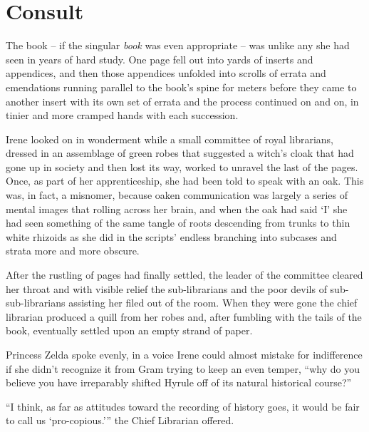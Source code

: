 \documentclass[../FGP.tex]{subfiles}
\begin{document}
\section{Consult}
\begin{fragment}The book -- if the singular \emph{book} was even appropriate -- was unlike any she had seen in years of hard study. One page fell out into yards of inserts and appendices, and then those appendices unfolded into scrolls of errata and emendations running parallel to the book's spine for meters before they came to another insert with its own set of errata and the process continued on and on, in tinier and more cramped hands with each succession. 

Irene looked on in wonderment while a small committee of royal librarians, dressed in an assemblage of green robes that suggested a witch's cloak that had gone up in society and then lost its way, worked to unravel the last of the pages. Once, as part of her apprenticeship, she had been told to speak with an oak. This was, in fact, a misnomer, because oaken communication was largely a series of  mental images that  rolling across her brain, and when the oak had said `I' she had seen something of the same tangle of roots descending from trunks to thin white rhizoids as she did in the scripts' endless branching into subcases and strata more and more obscure.  

After the rustling of pages had finally settled, the leader of the committee cleared her throat and with visible relief the sub-librarians and the poor devils of sub-sub-librarians assisting her filed out of the room. When they were gone the chief librarian produced a quill from her robes and, after fumbling with the tails of the book, eventually settled upon an empty strand of paper. 

Princess Zelda spoke evenly, in a voice Irene could almost mistake for indifference if she didn't recognize it from Gram trying to keep an even temper, ``why do you believe you have irreparably shifted Hyrule off of its natural historical course?''  
\end{fragment}

\begin{fragment}
``I think, as far as attitudes toward the recording of history goes, it would be fair to call us `pro-copious.'{''} the Chief Librarian offered. 
\end{fragment}
\end{document}
